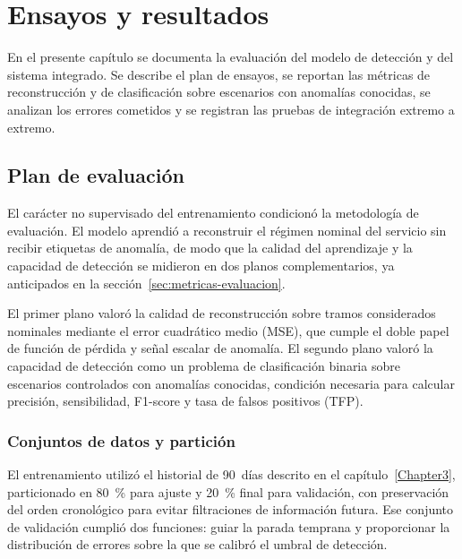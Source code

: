 
\chapter{Ensayos y resultados} %

\label{Chapter4}

En el presente capítulo se documenta la evaluación del modelo de detección y del sistema integrado. Se describe el plan de ensayos, se reportan las métricas de reconstrucción y de clasificación sobre escenarios con anomalías conocidas, se analizan los errores cometidos y se registran las pruebas de integración extremo a extremo.


\section{Plan de evaluación}
\label{sec:plan-evaluacion}

El carácter no supervisado del entrenamiento condicionó la metodología de evaluación. El modelo aprendió a reconstruir el régimen nominal del servicio sin recibir etiquetas de anomalía, de modo que la calidad del aprendizaje y la capacidad de detección se midieron en dos planos complementarios, ya anticipados en la sección~\ref{sec:metricas-evaluacion}.

El primer plano valoró la calidad de reconstrucción sobre tramos considerados nominales mediante el error cuadrático medio (MSE), que cumple el doble papel de función de pérdida y señal escalar de anomalía. El segundo plano valoró la capacidad de detección como un problema de clasificación binaria sobre escenarios controlados con anomalías conocidas, condición necesaria para calcular precisión, sensibilidad, F1-score y tasa de falsos positivos (TFP).

\subsection{Conjuntos de datos y partición}

El entrenamiento utilizó el historial de 90~días descrito en el capítulo~\ref{Chapter3}, particionado en 80~\% para ajuste y 20~\% final para validación, con preservación del orden cronológico para evitar filtraciones de información futura. Ese conjunto de validación cumplió dos funciones: guiar la parada temprana y proporcionar la distribución de errores sobre la que se calibró el umbral de detección.

